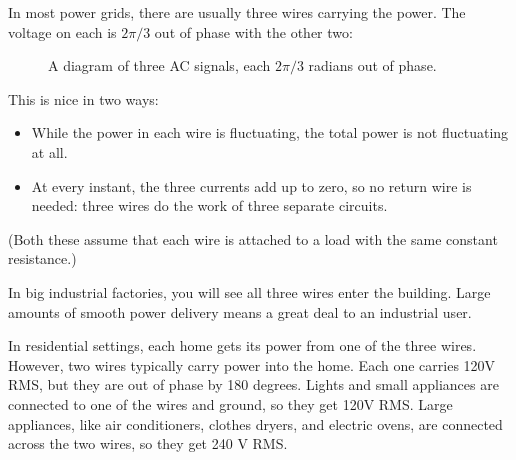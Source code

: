 In most power grids, there are usually three wires carrying the power.
The voltage on each is $2\pi/3$ out of phase with the other two:
\begin{figure}[H]
    \centering
    \caption{A diagram of three AC signals, each $2\pi/3$ radians out of phase.}
    \label{fig:ACphase}
\end{figure}

This is nice in two ways:
\begin{itemize}
\item While the power in each wire is fluctuating, the total power is not fluctuating at all.
\item At every instant, the three currents add up to zero, so no return
  wire is needed: three wires do the work of three separate circuits.
\end{itemize}
(Both these assume that each wire is attached to a load with the same constant resistance.)

In big industrial factories, you will see all three wires enter the
building. Large amounts of smooth power delivery means a great deal to an
industrial user.

In residential settings, each home gets its power from one of the three
wires. However, two wires typically carry power into the home. Each
one carries 120V RMS, but they are out of phase by 180 degrees. Lights
and small appliances are connected to one of the wires and ground, so
they get 120V RMS. Large appliances, like air conditioners, clothes dryers, and electric
ovens, are connected across the two wires, so they get 240 V RMS.

